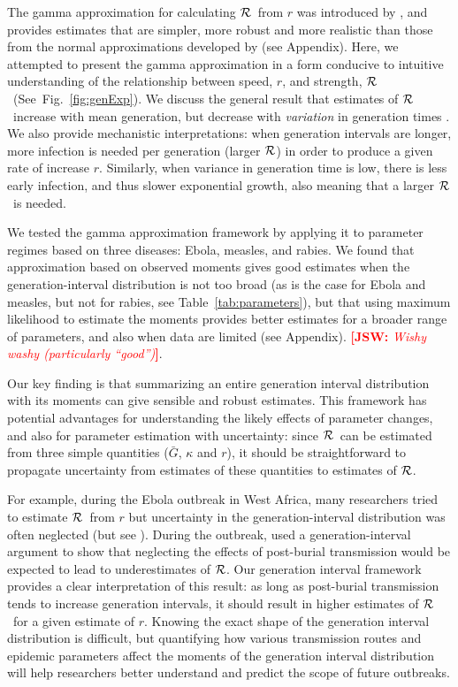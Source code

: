 \documentclass[12pt]{article}
\newcommand{\RR}{\ensuremath{{\cal R}}}
\newcommand{\fref}[1]{Fig.~\ref{fig:#1}}
\newcommand{\tref}[1]{Table~\ref{tab:#1}}
\newcommand{\comment}[3]{\textcolor{#1}{\textbf{[#2: }\textit{#3}\textbf{]}}}
\newcommand{\jsw}[1]{\comment{red}{JSW}{#1}}
\begin{document}
The gamma approximation for calculating \RR\ from $r$ was introduced by \cite{NishCast09}, and  provides estimates that are simpler, more robust and more realistic than those from the normal approximations developed by \cite{WallLips07} (see Appendix).
Here, we attempted to present the gamma approximation in a form conducive to intuitive understanding of the relationship between speed, $r$, and strength, \RR\ (See~\fref{genExp}).
We discuss the general result that estimates of \RR\ increase with mean generation, but decrease with \emph{variation} in generation times \cite{WallLips07}. 
We also provide mechanistic interpretations: when generation intervals are longer, more infection is needed per generation (larger \RR)  in order to produce a given rate of increase $r$. Similarly, when variance in generation time is low, there is less early infection, and thus slower exponential growth, also meaning that a larger \RR\ is needed. 

We tested the gamma approximation framework by applying it to parameter regimes based on three diseases: Ebola, measles, and rabies. 
We found that approximation based on observed moments gives good estimates when the generation-interval distribution is not too broad (as is the case for Ebola and measles, but not for rabies, see \tref{parameters}), but that using maximum likelihood to estimate the moments provides better estimates for a broader range of parameters, and also when data are limited (see Appendix). \jsw{Wishy washy (particularly ``good'')}.

Our key finding is that summarizing an entire generation interval distribution with its moments can give sensible and robust estimates.
This framework has potential advantages for understanding the likely effects of parameter changes, and also for parameter estimation with uncertainty: since \RR\ can be estimated from three simple quantities ($\bar G$, $\kappa$ and $r$), it should be straightforward to propagate uncertainty from estimates of these quantities to estimates of \RR.

For example, during the Ebola outbreak in West Africa, many researchers tried to estimate \RR\ from $r$ \cite{Alth14, AylwBarb14, NishChow15, RiveLofg14, 
KingDome15} but uncertainty in the generation-interval distribution was often neglected (but see \cite{TaylDush16}).  
During the outbreak, \cite{WeitDush15} used a generation-interval argument to  show that neglecting the effects of post-burial transmission would be expected to lead to underestimates of \RR.
Our generation interval framework provides a clear interpretation of this result: as long as post-burial transmission tends to increase generation intervals, it should result in higher estimates of \RR\ for a given estimate of $r$.
Knowing the exact shape of the generation interval distribution is difficult, but quantifying how various transmission routes and epidemic parameters affect the moments of the generation interval distribution will help researchers better understand and predict the scope of future outbreaks.
\end{document}
